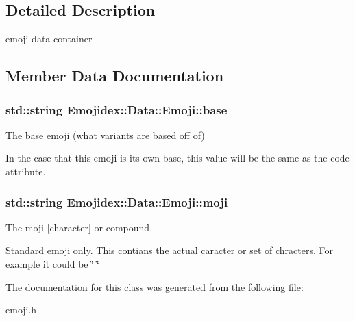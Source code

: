 \subsection{Detailed Description}
emoji data container 

\subsection{Member Data Documentation}
\subsubsection[{\texorpdfstring{base}{base}}]{\setlength{\rightskip}{0pt plus 5cm}std\+::string Emojidex\+::\+Data\+::\+Emoji\+::base}\hypertarget{classEmojidex_1_1Data_1_1Emoji_a91a8ecf38a8a36bda309ad290575c5e8}{}\label{classEmojidex_1_1Data_1_1Emoji_a91a8ecf38a8a36bda309ad290575c5e8}


The base emoji (what variants are based off of) 

In the case that this emoji is its own base, this value will be the same as the code attribute. 
\subsubsection[{\texorpdfstring{moji}{moji}}]{\setlength{\rightskip}{0pt plus 5cm}std\+::string Emojidex\+::\+Data\+::\+Emoji\+::moji}\hypertarget{classEmojidex_1_1Data_1_1Emoji_a4503be17248d982d5574779ffc0bb2eb}{}\label{classEmojidex_1_1Data_1_1Emoji_a4503be17248d982d5574779ffc0bb2eb}


The moji \mbox{[}character\mbox{]} or compound. 

Standard emoji only. This contians the actual caracter or set of chracters. For example it could be \char`\"{}💩\char`\"{} 

The documentation for this class was generated from the following file\+:\begin{DoxyCompactItemize}
\item 
emoji.\+h\end{DoxyCompactItemize}
